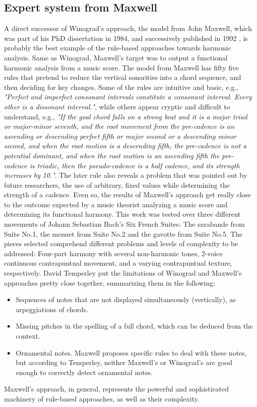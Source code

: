     \subsection{Expert system from Maxwell}
    A direct successor of Winograd's approach, the model from John Maxwell, which was part of his PhD dissertation in 1984, and successively published in 1992 \cite{maxwell1992expert}, is probably the best example of the rule-based approaches towards harmonic analysis. Same as Winograd, Maxwell's target was to output a functional harmonic analysis from a music score. The model from Maxwell has fifty five rules that pretend to reduce the vertical sonorities into a chord sequence, and then deciding for key changes. Some of the rules are intuitive and basic, e.g., \emph{"Perfect and imperfect consonant intervals constitute a consonant interval. Every other is a dissonant interval."}, while others appear cryptic and difficult to understand, e.g., \emph{"If the goal chord falls on a strong beat and it is a major triad or major-minor seventh, and the root movement from the pre-cadence is an ascending or descending perfect fifth or major second or a descending minor second, and when the root motion is a descending fifth, the pre-cadence is not a potential dominant, and when the root motion is an ascending fifth the pre-cadence is triadic, then the pseudo-cadence is a half cadence, and its strength increases by 10."}.
    The later rule also reveals a problem that was pointed out by future researchers, the use of arbitrary, fixed values while determining the strength of a cadence. Even so, the results of Maxwell's approach get really close to the outcome expected by a music theorist analyzing a music score and determining its functional harmony. This work was tested over three different movements of Johann Sebastian Bach's Six French Suites: The sarabande from Suite No.1, the menuet from Suite No.2 and the gavotte from Suite No.5. The pieces selected comprehend different problems and levels of complexity to be addressed: Four-part harmony with several non-harmonic tones, 2-voice continuous contrapuntual movement, and a varying contrapuntual texture, respectively. David Temperley put the limitations of Winograd and Maxwell's approaches pretty close together, summarizing them in the following:
		\begin{itemize}
			\item Sequences of notes that are not displayed simultaneously (vertically), as arpeggiations of chords.
			\item Missing pitches in the spelling of a full chord, which can be deduced from the context.
			\item Ornamental notes. Maxwell proposes specific rules to deal with these notes, but according to Temperley, neither Maxwell's or Winograd's are good enough to correctly detect ornamental notes.
    \end{itemize}
    Maxwell's approach, in general, represents the powerful and sophisticated machinery of rule-based approaches, as well as their complexity.
